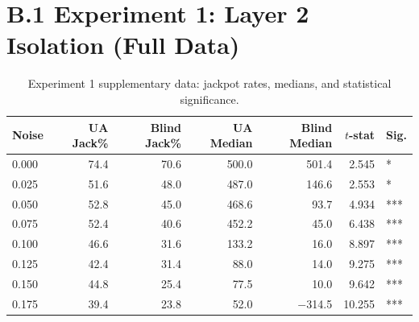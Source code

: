 \documentclass[12pt,a4paper]{report}
\begin{document}
\section*{B.1 Experiment 1: Layer 2 Isolation (Full Data)}

\begin{table}[h]
\centering
\small
\caption{Experiment 1 complete results: UA vs Blind agent without safety supervisor (500 episodes per noise level).}
\label{tab:app_exp1}
\setlength{\tabcolsep}{4pt}
\end{table}

\begin{table}[h]
\centering
\small
\caption{Experiment 1 supplementary data: jackpot rates, medians, and statistical significance.}
\label{tab:app_exp1_supp}
\setlength{\tabcolsep}{4pt}
\begin{tabular}{lrrrrrl}
\toprule
\textbf{Noise} & \textbf{UA Jack\%} & \textbf{Blind Jack\%} & \textbf{UA Median} & \textbf{Blind Median} & \textbf{$t$-stat} & \textbf{Sig.} \\
\midrule
0.000 & 74.4 & 70.6 & 500.0 & 501.4 & 2.545 & * \\
0.025 & 51.6 & 48.0 & 487.0 & 146.6 & 2.553 & * \\
0.050 & 52.8 & 45.0 & 468.6 & 93.7 & 4.934 & *** \\
0.075 & 52.4 & 40.6 & 452.2 & 45.0 & 6.438 & *** \\
0.100 & 46.6 & 31.6 & 133.2 & 16.0 & 8.897 & *** \\
0.125 & 42.4 & 31.4 & 88.0 & 14.0 & 9.275 & *** \\
0.150 & 44.8 & 25.4 & 77.5 & 10.0 & 9.642 & *** \\
0.175 & 39.4 & 23.8 & 52.0 & $-$314.5 & 10.255 & *** \\
\bottomrule
\end{tabular}
\end{table}
\end{document}
